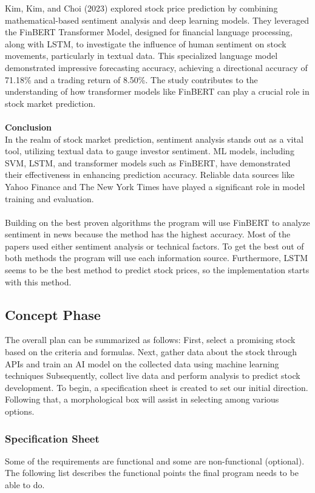 Kim, Kim, and Choi (2023) explored stock price prediction by combining mathematical-based sentiment analysis and deep learning models. They leveraged the \ac{FinBERT} Transformer Model, designed for financial language processing, along with \ac{LSTM}, to investigate the influence of human sentiment on stock movements, particularly in textual data. This specialized language model demonstrated impressive forecasting accuracy, achieving a directional accuracy of 71.18\% and a trading return of 8.50\%. The study contributes to the understanding of how transformer models like \ac{FinBERT} can play a crucial role in stock market prediction.\cite{Jihan2023}\\
\\
\textbf{Conclusion}\\
In the realm of stock market prediction, sentiment analysis stands out as a vital tool, utilizing textual data to gauge investor sentiment. \ac{ML} models, including \ac{SVM}, \ac{LSTM}, and transformer models such as  \ac{FinBERT}, have demonstrated their effectiveness in enhancing prediction accuracy. Reliable data sources like Yahoo Finance and The New York Times have played a significant role in model training and evaluation.\\
\\
Building on the best proven algorithms the program will use \ac{FinBERT} to analyze sentiment in news because the method has the highest accuracy. Most of the papers used either sentiment analysis or technical factors. To get the best out of both methods the program will use each information source. Furthermore, \ac{LSTM} seems to be the best method to predict stock prices, so the implementation starts with this method.
\clearpage
\subsection{Concept Phase}\label{sec: Concept Phase}
The overall plan can be summarized as follows: First, select a promising stock based on the criteria and formulas. Next, gather data about the stock through \ac{API}s and train an \ac{AI} model on the collected data using machine learning techniques Subsequently, collect live data and perform analysis to predict stock development. To begin, a specification sheet is created to set our initial direction. Following that, a morphological box will assist in selecting among various options.
\subsubsection{Specification Sheet}\label{sec: Specification Sheet}
Some of the requirements are functional and some are non-functional (optional). The following list describes the functional points the final program needs to be able to do.
